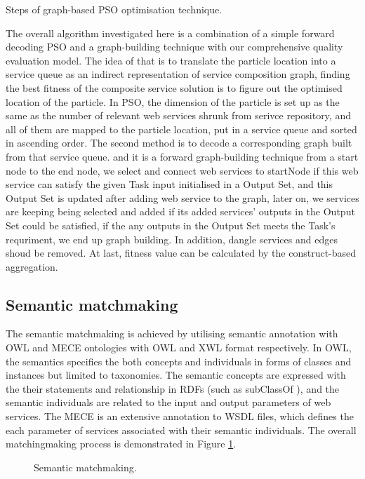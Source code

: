 \documentclass{llncs}
\begin{document}
\begin{algorithm}[!htb]
 \caption{Steps of graph-based PSO optimisation technique.}
\label{psoSteps}
\end{algorithm}
The overall algorithm investigated here is a combination of a simple forward decoding PSO \cite{da2016particle} and a graph-building technique \cite{blum1997fast} with our comprehensive quality evaluation model. The idea of that is to translate the particle location into a service queue as an indirect representation of service composition graph, finding the best fitness of the composite service solution is to figure out the optimised location of the particle. In PSO, the dimension of the particle is set up as the same as the number of relevant web services shrunk from serivce repository, and all of them are mapped to the particle location, put in a service queue and sorted in ascending order. The second method is to decode a corresponding graph built from that service queue. and it is a forward graph-building technique from a start node to the end node, we select and connect web services to startNode if this web service can satisfy the given Task input initialised in a Output Set, and this Output Set is updated after adding web service to the graph, later on, we services are keeping being selected and added if its added services' outputs in the Output Set could be satisfied, if the any outputs in the Output Set meets the Task's requriment, we end up graph building. In addition, dangle services and edges shoud be removed. At last, fitness value can be calculated by the construct-based aggregation.

\subsection{Semantic matchmaking}
The semantic matchmaking is achieved by utilising semantic annotation with OWL and MECE ontologies \cite{bleul2008self} with OWL and XWL format respectively. In OWL,  the semantics specifies the both concepts and individuals in forms of classes and instances but limited to taxonomies. The semantic concepts are expressed with the their statements and relationship in RDFs (such as subClassOf ), and the semantic individuals are related to the input and output parameters of web services. The MECE is an extensive annotation to WSDL files, which defines the each parameter of services associated with their semantic individuals. The overall matchingmaking process is demonstrated in Figure \ref{matchmaking}.

\begin{figure}[h]
\centerline{
}
 \caption{Semantic matchmaking.}
 \label{matchmaking}
\end{figure}
\end{document}

